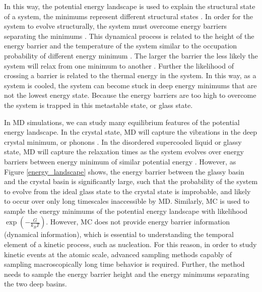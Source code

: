 In this way, the potential energy landscape is used to explain the structural state of a system, the minimums represent different structural states \cite{Debenedetti2001}.  In order for the system to evolve structurally, the system must overcome energy barriers separating the minimums  \cite{Debenedetti2001}.  This dynamical process is related to the height of the energy barrier and the temperature of the system similar to the occupation probability of different energy minimum \cite{Debenedetti2001}.  The larger the barrier the less likely the system will relax from one minimum to another  \cite{Debenedetti2001}.  Further the likelihood of crossing a barrier is related to the thermal energy in the system.  In this way, as a system is cooled, the system can become stuck in deep energy minimums that are not the lowest energy state.  Because the energy barriers are too high to overcome the system is trapped in this metastable state, or glass state.  

In MD simulations, we can study many equilibrium features of the potential energy landscape.  In the crystal state, MD will capture the vibrations in the deep crystal minimum, or phonons \cite{Debenedetti2001}.  In the disordered supercooled liquid or glassy state, MD will capture the relaxation times as the system evolves over energy barriers between energy minimum of similar potential energy \cite{Debenedetti2001}.  However, as Figure \ref{energy_landscape} shows, the energy barrier between the glassy basin and the crystal basin is significantly large, such that the probability of the system to evolve from the ideal glass state to the crystal state is improbable, and likely to occur over only long timescales inaccessible by MD.  Similarly, MC is used to sample the energy minimums of the potential energy landscape with likelihood $\exp(-\frac{G}{k_BT})$.  However, MC does not provide energy barrier information (dynamical information), which is essential to understanding the temporal element of a kinetic process, such as nucleation.  For this reason, in order to study kinetic events at the atomic scale, advanced sampling methods capably of sampling macroscopically long time behavior is required.  Further, the method needs to sample the energy barrier height and the energy minimums separating the two deep basins.

